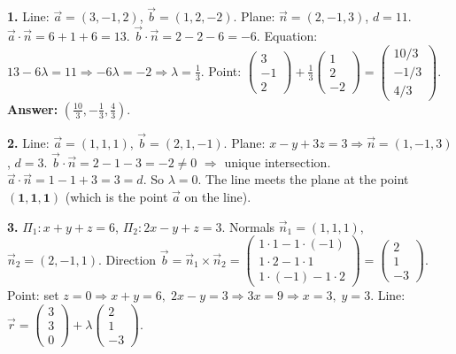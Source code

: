 \documentclass[11pt]{article}
\begin{document}
\begin{corrige}[Exercises]
\textbf{1.} Line: $\vec{a}=(3,-1,2)$, $\vec{b}=(1,2,-2)$. Plane: $\vec{n}=(2,-1,3)$, $d=11$.
$\vec{a}\cdot\vec{n} = 6 + 1 + 6 = 13$. $\vec{b}\cdot\vec{n} = 2 - 2 - 6 = -6$.
Equation: $13 - 6\lambda = 11 \Rightarrow -6\lambda = -2 \Rightarrow \lambda = \tfrac{1}{3}$.
Point: $\begin{pmatrix} 3 \\ -1 \\ 2 \end{pmatrix} + \tfrac{1}{3}\begin{pmatrix} 1 \\ 2 \\ -2 \end{pmatrix} = \begin{pmatrix} 10/3 \\ -1/3 \\ 4/3 \end{pmatrix}$.
\textbf{Answer:} $\left(\tfrac{10}{3}, -\tfrac{1}{3}, \tfrac{4}{3}\right)$.

\textbf{2.} Line: $\vec{a}=(1,1,1)$, $\vec{b}=(2,1,-1)$. Plane: $x-y+3z=3 \Rightarrow \vec{n}=(1,-1,3)$, $d=3$.
$\vec{b}\cdot\vec{n} = 2 - 1 - 3 = -2 \neq 0$ $\Rightarrow$ unique intersection.
$\vec{a}\cdot\vec{n} = 1 - 1 + 3 = 3 = d$. So $\lambda = 0$.
The line meets the plane at the point $\mathbf{(1,1,1)}$ (which is the point $\vec{a}$ on the line).

\textbf{3.} $\Pi_1: x+y+z=6$, $\Pi_2: 2x-y+z=3$. Normals $\vec{n}_1=(1,1,1)$, $\vec{n}_2=(2,-1,1)$.
Direction $\vec{b} = \vec{n}_1 \times \vec{n}_2 = \begin{pmatrix} 1\cdot1 - 1\cdot(-1) \\ 1\cdot2 - 1\cdot1 \\ 1\cdot(-1) - 1\cdot2 \end{pmatrix} = \begin{pmatrix} 2 \\ 1 \\ -3 \end{pmatrix}$.
Point: set $z=0 \Rightarrow x+y=6,\; 2x-y=3 \Rightarrow 3x=9 \Rightarrow x=3,\; y=3$.
Line: $\vec{r} = \begin{pmatrix} 3 \\ 3 \\ 0 \end{pmatrix} + \lambda\begin{pmatrix} 2 \\ 1 \\ -3 \end{pmatrix}$.


\end{corrige}
\end{document}

